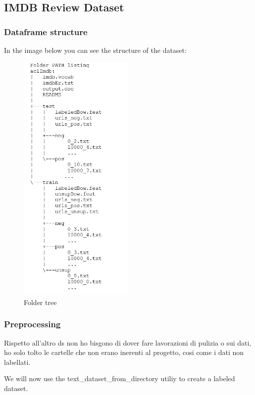 \newpage
\subsection{IMDB Review Dataset}

\subsubsection*{Dataframe structure}
In the image below you can see the structure of the dataset:
\begin{figure}[ht!]
\centering
\includegraphics[width=0.5\textwidth]{images/foldertree.jpg}
\caption{Folder tree}
\label{fig:fig_0}
\end{figure}
\FloatBarrier

\subsubsection{Preprocessing}
Rispetto all'altro ds non ho bisgono di dover fare lavorazioni di pulizia o sui dati, ho solo tolto le cartelle che non erano inerenti al progetto, cosi come i dati non labellati.

We will now use the text\_dataset\_from\_directory utiliy to create a labeled dataset.

